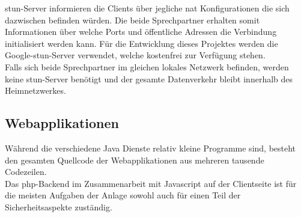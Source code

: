 \gls{stun}-Server informieren die Clients über jegliche \gls{nat} Konfigurationen die sich dazwischen befinden würden. Die beide Sprechpartner erhalten somit Informationen über welche Ports und öffentliche Adressen die Verbindung initialisiert werden kann. Für die Entwicklung dieses Projektes werden die Google-\gls{stun}-Server verwendet, welche kostenfrei zur Verfügung stehen.
\\
Falls sich beide Sprechpartner im gleichen lokales Netzwerk befinden, werden keine \gls{stun}-Server benötigt und der gesamte Datenverkehr bleibt innerhalb des Heimnetzwerkes.

\subsection{Webapplikationen}
\label{kap:webapp}
Während die verschiedene Java Dienste relativ kleine Programme sind, besteht den gesamten Quellcode der Webapplikationen aus mehreren tausende Codezeilen. 
\\
Das \gls{php}-Backend im Zusammenarbeit mit Javascript auf der Clientseite ist für die meisten Aufgaben der Anlage sowohl auch für einen Teil der Sicherheitsaspekte zuständig.

